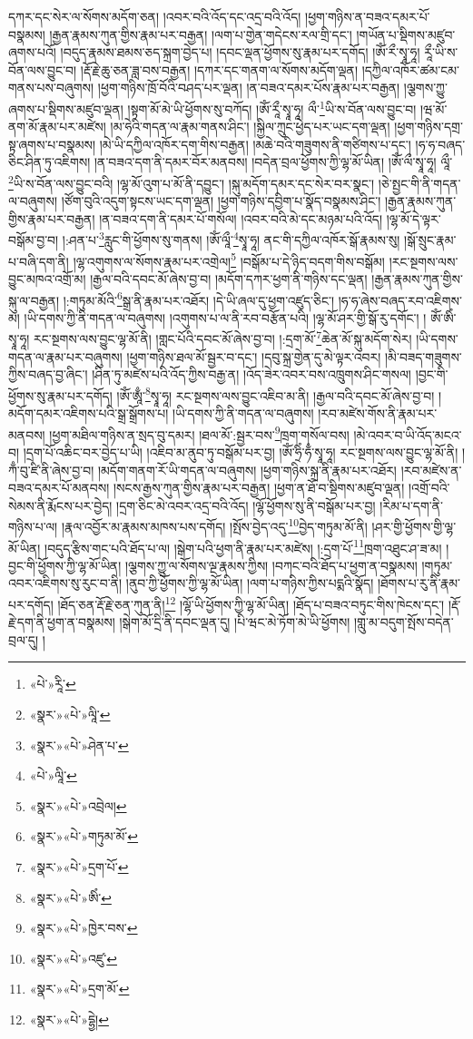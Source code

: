 དཀར་དང་སེར་ལ་སོགས་མདོག་ཅན། །འབར་བའི་འོད་དང་འདྲ་བའི་འོད། །ཕྱག་གཉིས་ན་བཟའ་དམར་པོ་བསྣམས། །རྒྱན་རྣམས་ཀུན་གྱིས་རྣམ་པར་བརྒྱན། །ལག་པ་གྱེན་གདེངས་རལ་གྲི་དང་། །གཡོན་པ་སྡིགས་མཛུབ་ཞགས་པའོ། །བདུད་རྣམས་ཐམས་ཅད་སྐྲག་བྱེད་པ། །དབང་ལྡན་ཕྱོགས་སུ་རྣམ་པར་དགོད། །ཨོཾ་རྀ་སྭཱ་ཧཱ། རཱྀ་ཡི་ས་བོན་ལས་བྱུང་བ། །རྡོ་རྗེ་ཆུ་ཅན་ཟླ་བས་བརྒྱན། །དཀར་དང་གནག་ལ་སོགས་མདོག་ལྡན། །དཀྱིལ་འཁོར་ཚམ་ངམ་གནས་པས་བཞུགས། །ཕྱག་གཉིས་ཁྲོ་བོའི་བཤད་པར་ལྡན། །ན་བཟའ་དམར་པོས་རྣམ་པར་བརྒྱན། །ལྕགས་ཀྱུ་ཞགས་པ་སྡིགས་མཛུབ་ལྡན། །སྟག་མོ་མེ་ཡི་ཕྱོགས་སུ་བཀོད། །ཨོཾ་རཱྀ་སྭཱ་ཧཱ། ལྀ་\footnote{«པེ་»རཱི་}ཡི་ས་བོན་ལས་བྱུང་བ། །ཝ་མོ་ནག་མོ་རྣམ་པར་མཛེས། །མ་ཧེའི་གདན་ལ་རྣམ་གནས་ཤིང་། །སྐྱིལ་ཀྲུང་ཕྱེད་པར་ཡང་དག་ལྡན། །ཕྱག་གཉིས་དགྲ་སྟ་ཞགས་པ་བསྣམས། །མེ་ཡི་དཀྱིལ་འཁོར་དག་གིས་བརྒྱན། །མཆེ་བའི་གཟུགས་ནི་གཙིགས་པ་དང་། །ཧ་ཧ་བཞད་ཅིང་ཤིན་ཏུ་འཇིགས། །ན་བཟའ་དག་ནི་དམར་བོར་མནབས། །བདེན་བྲལ་ཕྱོགས་ཀྱི་ལྷ་མོ་ཡིན། །ཨོཾ་ལྀ་སྭཱ་ཧཱ། ལཱྀ་\footnote{«སྣར་»«པེ་»ལཱི་}ཡི་ས་བོན་ལས་བྱུང་བའི། །ལྷ་མོ་འུག་པ་མོ་ནི་དབྱུང་། །སྐུ་མདོག་དམར་དང་སེར་བར་སྣང་། །ཅེ་སྤྱང་གི་ནི་གདན་ལ་བཞུགས། །ཙོག་བུའི་འདུག་སྟངས་ཡང་དག་ལྡན། །ཕྱག་གཉིས་དབྱིག་པ་སྣོད་བསྣམས་ཤིང་། །རྒྱན་རྣམས་ཀུན་གྱིས་རྣམ་པར་བརྒྱན། །ན་བཟའ་དག་ནི་དམར་པོ་གསོལ། །འབར་བའི་མེ་དང་མཉམ་པའི་འོད། །ལྷ་མོ་དེ་ལྟར་བསྒོམ་བྱ་བ། །:ཤན་པ་\footnote{«སྣར་»«པེ་»ཤེན་པ་}རླུང་གི་ཕྱོགས་སུ་གནས། །ཨོཾ་ལཱྀ་\footnote{«པེ་»ལཱི་}སྭཱ་ཧཱ། ནང་གི་དཀྱིལ་འཁོར་སྒོ་རྣམས་སུ། །སྒོ་སྲུང་རྣམ་པ་བཞི་དག་ནི། །ལྷ་འགུགས་ལ་སོགས་རྣམ་པར་འགྲེལ།\footnote{«སྣར་»«པེ་»འབྲེལ།} །བསྒོམ་པ་དེ་ཉིད་བདག་གིས་བསྒོམ། །རང་སྔགས་ལས་བྱུང་མཁའ་འགྲོ་མ། །རྒྱལ་བའི་དབང་མོ་ཞེས་བྱ་བ། །མདོག་དཀར་ཕྱག་ནི་གཉིས་དང་ལྡན། །རྒྱན་རྣམས་ཀུན་གྱིས་སྐུ་ལ་བརྒྱན། །:གཏུམ་མོའི་\footnote{«སྣར་»«པེ་»གཏུམ་མོ་}སྒྲ་ནི་རྣམ་པར་འཐོར། །དེ་ཡི་ཞལ་དུ་ཕྱག་འཛུད་ཅིང་། །ཧ་ཧ་ཞེས་བཞད་རབ་འཇིགས་མ། །ཡི་དགས་ཀྱི་ནི་གདན་ལ་བཞུགས། །འགུགས་པ་ལ་ནི་རབ་བརྩོན་པའི། །ལྷ་མོ་ཤར་གྱི་སྒོ་རུ་དགོང་། །
ཨོཾ་ཨིཾ་སྭཱ་ཧཱ། རང་སྔགས་ལས་བྱུང་ལྷ་མོ་ནི། །གླང་པོའི་དབང་མོ་ཞེས་བྱ་བ། །:དྲག་མོ་\footnote{«སྣར་»«པེ་»དྲག་པོ་}ཆེན་མོ་སྐུ་མདོག་སེར། །ཡི་དགས་གདན་ལ་རྣམ་པར་བཞུགས། །ཕྱག་གཉིས་ཐལ་མོ་སྦྱར་བ་དང་། །དབུ་སྐྲ་གྱེན་དུ་མེ་ལྟར་འབར། །མི་བཟད་གཟུགས་ཀྱིས་བཞད་བྱ་ཞིང་། །ཤིན་ཏུ་མཛེས་པའི་འོད་ཀྱིས་བརྒྱ་ན། །འོད་ཟེར་འབར་བས་འཁྲུགས་ཤིང་གསལ། །བྱང་གི་ཕྱོགས་སུ་རྣམ་པར་དགོད། །ཨོཾ་ཨཱྃ་\footnote{«སྣར་»«པེ་»ཨིཾ་}སྭཱ་ཧཱ། རང་སྔགས་ལས་བྱུང་འཇིབ་མ་ནི། །རྒྱལ་བའི་དབང་མོ་ཞེས་བྱ་བ། །མདོག་དམར་འཇིགས་པའི་སྒྲ་སྒྲོགས་པ། །ཡི་དགས་ཀྱི་ནི་གདན་ལ་བཞུགས། །རབ་མཛེས་གོས་ནི་རྣམ་པར་མནབས། །ཕྱག་མཐིལ་གཉིས་ན་སྲད་བུ་དམར། །ཐལ་མོ་:སྦྱར་བས་\footnote{«སྣར་»«པེ་»ཁྱེར་བས་}ཁྲག་གསོལ་བས། །མེ་འབར་བ་ཡི་འོད་མངའ་བ། །དྲག་པོ་འཆིང་བར་བྱེད་པ་ཡི། །འཇིབ་མ་ནུབ་ཏུ་བསྒོམ་པར་བྱ། །ཨོཾ་ཧྲིཾ་ཧྃ་སྭཱ་ཧཱ། རང་སྔགས་ལས་བྱུང་ལྷ་མོ་ནི། །ཀྃ་བུ་ཛི་ནི་ཞེས་བྱ་བ། །མདོག་གནག་རོ་ཡི་གདན་ལ་བཞུགས། །ཕྱག་གཉིས་སྐྲ་ནི་རྣམ་པར་འཐོར། །རབ་མཛེས་ན་བཟའ་དམར་པོ་མནབས། །སངས་རྒྱས་ཀུན་གྱིས་རྣམ་པར་བརྒྱན། །ཕྱག་ན་ཐོ་བ་སྡིགས་མཛུབ་ལྡན། །འགྲོ་བའི་སེམས་ནི་རྨོངས་པར་བྱེད། །དྲག་ཅིང་མེ་འབར་འདྲ་བའི་འོད། །ལྷོ་ཕྱོགས་སུ་ནི་བསྒོམ་པར་བྱ། །རིམ་པ་དག་ནི་གཉིས་པ་ལ། །རྣལ་འབྱོར་མ་རྣམས་མཁས་པས་དགོད། །སྤོས་བྱེད་འདུ་\footnote{«སྣར་»«པེ་»འཛུ་}བྱེད་གཏུམ་མོ་ནི། །ཤར་གྱི་ཕྱོགས་གྱི་ལྷ་མོ་ཡིན། །བདུད་རྩིས་གང་པའི་ཐོད་པ་ལ། །སྒེག་པའི་ཕྱག་ནི་རྣམ་པར་མཛེས། །:དྲག་པོ་\footnote{«སྣར་»«པེ་»དྲག་མོ་}ཁྲག་འཐུང་ཤ་ཟ་མ། །བྱང་གི་ཕྱོགས་ཀྱི་ལྷ་མོ་ཡིན། །ལྕགས་ཀྱུ་ལ་སོགས་ལྔ་རྣམས་ཀྱིས། །བཀང་བའི་ཐོད་པ་ཕྱག་ན་བསྣམས། །གཏུམ་འབར་འཇིགས་སུ་རུང་བ་ནི། །ནུབ་ཀྱི་ཕྱོགས་ཀྱི་ལྷ་མོ་ཡིན། །ལག་པ་གཉིས་ཀྱིས་པདྨའི་སྣོད། །ཐོགས་པ་རུ་ནི་རྣམ་པར་དགོད། །ཐོད་ཅན་རྡོ་རྗེ་ཅན་ཀུན་ནི།\footnote{«སྣར་»«པེ་»དྷྱེ།} །ལྷོ་ཡི་ཕྱོགས་ཀྱི་ལྷ་མོ་ཡིན། །ཐོད་པ་བཟའ་བཏུང་གིས་ཁེངས་དང་། །རྡོ་རྗེ་དག་ནི་ཕྱག་ན་བསྣམས། །སྒེག་མོ་དྲི་ནི་དབང་ལྡན་དུ། །པི་ཝང་མེ་ཏོག་མེ་ཡི་ཕྱོགས། །གླུ་མ་བདུག་སྤོས་བདེན་བྲལ་དུ། །
